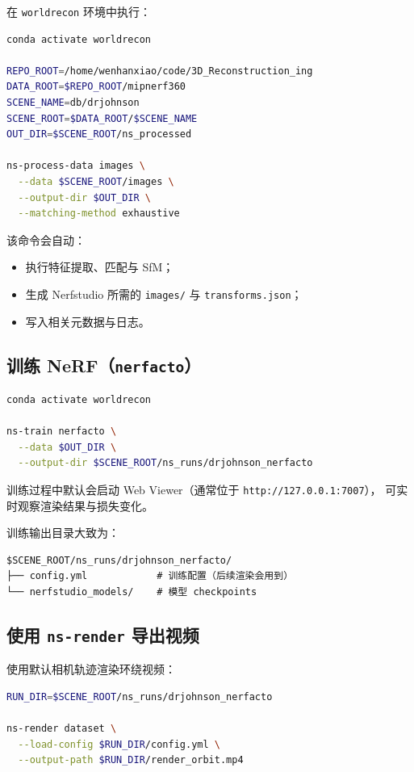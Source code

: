 \documentclass[12pt]{ctexart}
\begin{document}
在 \texttt{worldrecon} 环境中执行：
\begin{lstlisting}[language=bash]
conda activate worldrecon

REPO_ROOT=/home/wenhanxiao/code/3D_Reconstruction_ing
DATA_ROOT=$REPO_ROOT/mipnerf360
SCENE_NAME=db/drjohnson
SCENE_ROOT=$DATA_ROOT/$SCENE_NAME
OUT_DIR=$SCENE_ROOT/ns_processed

ns-process-data images \
  --data $SCENE_ROOT/images \
  --output-dir $OUT_DIR \
  --matching-method exhaustive
\end{lstlisting}

该命令会自动：
\begin{itemize}
  \item 执行特征提取、匹配与 SfM；
  \item 生成 Nerfstudio 所需的 \texttt{images/} 与 \texttt{transforms.json}；
  \item 写入相关元数据与日志。
\end{itemize}

\subsection{训练 NeRF（\texttt{nerfacto}）}

\begin{lstlisting}[language=bash]
conda activate worldrecon

ns-train nerfacto \
  --data $OUT_DIR \
  --output-dir $SCENE_ROOT/ns_runs/drjohnson_nerfacto
\end{lstlisting}

训练过程中默认会启动 Web Viewer（通常位于 \texttt{http://127.0.0.1:7007}），
可实时观察渲染结果与损失变化。

训练输出目录大致为：
\begin{lstlisting}
$SCENE_ROOT/ns_runs/drjohnson_nerfacto/
├── config.yml            # 训练配置（后续渲染会用到）
└── nerfstudio_models/    # 模型 checkpoints
\end{lstlisting}

\subsection{使用 \texttt{ns-render} 导出视频}

使用默认相机轨迹渲染环绕视频：
\begin{lstlisting}[language=bash]
RUN_DIR=$SCENE_ROOT/ns_runs/drjohnson_nerfacto

ns-render dataset \
  --load-config $RUN_DIR/config.yml \
  --output-path $RUN_DIR/render_orbit.mp4
\end{lstlisting}
\end{document}
